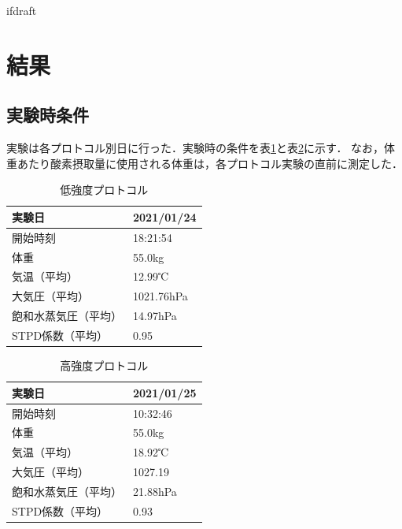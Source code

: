 \expandafter\ifx\csname ifdraft\endcsname\relax
 
\fi

\section{結果}

\subsection{実験時条件}

実験は各プロトコル別日に行った．実験時の条件を表\ref{tb:light_experiment}と表\ref{tb:hard_experiment}に示す．
なお，体重あたり酸素摂取量に使用される体重は，各プロトコル実験の直前に測定した．

\begin{table}[H]
  \begin{center}
  \caption{低強度プロトコル}
  \label{tb:light_experiment}
    \begin{tabular}{|l|l|}
      \hline
      実験日 & 2021/01/24 \\ \hline
      開始時刻 & 18:21:54 \\ \hline
      体重 & 55.0kg \\ \hline
      気温（平均） & 12.99℃ \\ \hline
      大気圧（平均） & 1021.76hPa \\ \hline
      飽和水蒸気圧（平均） & 14.97hPa　\\ \hline
      STPD係数（平均） & 0.95 \\ \hline
    \end{tabular}
  \end{center}
\end{table}

\begin{table}[H]
  \begin{center}
  \caption{高強度プロトコル}
  \label{tb:hard_experiment}
    \begin{tabular}{|l|l|}
      \hline
      実験日 & 2021/01/25 \\ \hline
      開始時刻 & 10:32:46 \\ \hline
      体重 & 55.0kg \\ \hline
      気温（平均） & 18.92℃ \\ \hline
      大気圧（平均） & 1027.19 \\ \hline
      飽和水蒸気圧（平均） & 21.88hPa　\\ \hline
      STPD係数（平均） & 0.93 \\ \hline
    \end{tabular}
  \end{center}
\end{table}

